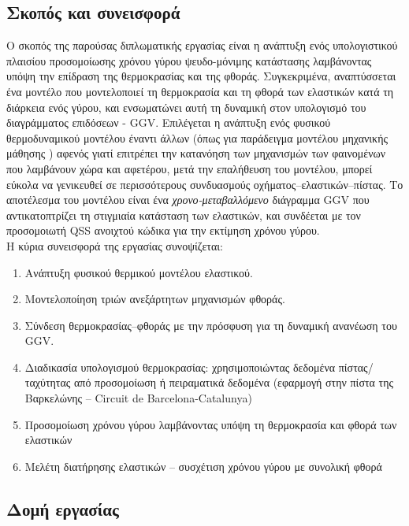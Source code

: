 \subsection*{Σκοπός και συνεισφορά}

Ο σκοπός της παρούσας διπλωματικής εργασίας είναι η ανάπτυξη ενός υπολογιστικού πλαισίου προσομοίωσης χρόνου γύρου ψευδο-μόνιμης κατάστασης λαμβάνοντας υπόψη
την επίδραση της θερμοκρασίας και της φθοράς. Συγκεκριμένα, αναπτύσσεται ένα 
μοντέλο που μοντελοποιεί τη
θερμοκρασία και τη φθορά των ελαστικών κατά τη διάρκεια ενός γύρου, και ενσωματώνει αυτή
τη δυναμική στον υπολογισμό του διαγράμματος επιδόσεων - GGV. Επιλέγεται η ανάπτυξη ενός φυσικού θερμοδυναμικού μοντέλου έναντι άλλων 
(όπως για παράδειγμα μοντέλου μηχανικής μάθησης \cite{Todd_2025}) αφενός γιατί επιτρέπει την κατανόηση των μηχανισμών των φαινομένων που λαμβάνουν χώρα και
αφετέρου, μετά την επαλήθευση του μοντέλου, μπορεί εύκολα να γενικευθεί σε περισσότερους συνδυασμούς οχήματος--ελαστικών--πίστας.
Το αποτέλεσμα του μοντέλου είναι ένα
\emph{χρονο-μεταβαλλόμενο} διάγραμμα GGV που αντικατοπτρίζει τη στιγμιαία κατάσταση των ελαστικών,
και συνδέεται με τον προσομοιωτή QSS ανοιχτού κώδικα \openLap για την εκτίμηση χρόνου γύρου.\\[8pt]

\noindent
Η κύρια συνεισφορά της εργασίας συνοψίζεται:
\begin{enumerate}
    \item Ανάπτυξη φυσικού θερμικού μοντέλου ελαστικού.
    \item Μοντελοποίηση τριών ανεξάρτητων μηχανισμών φθοράς.
    \item Σύνδεση θερμοκρασίας--φθοράς με την πρόσφυση για τη δυναμική ανανέωση του GGV.
    \item Διαδικασία υπολογισμού θερμοκρασίας: χρησιμοποιώντας δεδομένα πίστας/ταχύτητας από προσομοίωση ή πειραματικά δεδομένα 
    (εφαρμογή στην πίστα της Βαρκελώνης -- Circuit de Barcelona-Catalunya) 
    \item Προσομοίωση χρόνου γύρου λαμβάνοντας υπόψη τη θερμοκρασία και φθορά των ελαστικών
    \item Μελέτη διατήρησης ελαστικών -- συσχέτιση χρόνου γύρου με συνολική φθορά%
\end{enumerate}

\subsection*{Δομή εργασίας}

